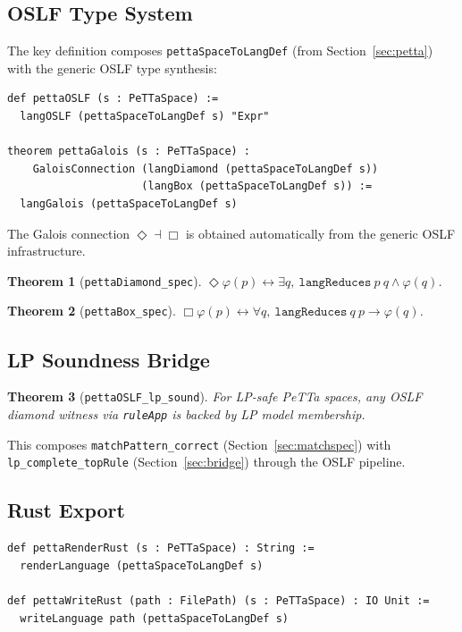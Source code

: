\documentclass[]{article}
\newtheorem{theorem}{Theorem}
\newcommand{\code}[1]{\texttt{#1}}
\newcommand{\PeTTa}{\textup{PeTTa}}
\newcommand{\OSLF}{\textup{OSLF}}
\begin{document}
\subsection{OSLF Type System}

The key definition composes \code{pettaSpaceToLangDef} (from
Section~\ref{sec:petta}) with the generic \OSLF{} type synthesis:

\begin{lstlisting}[language=lean]
def pettaOSLF (s : PeTTaSpace) :=
  langOSLF (pettaSpaceToLangDef s) "Expr"

theorem pettaGalois (s : PeTTaSpace) :
    GaloisConnection (langDiamond (pettaSpaceToLangDef s))
                     (langBox (pettaSpaceToLangDef s)) :=
  langGalois (pettaSpaceToLangDef s)
\end{lstlisting}

The Galois connection $\Diamond \dashv \Box$ is obtained automatically from
the generic \OSLF{} infrastructure.

\begin{theorem}[\code{pettaDiamond\_spec}]
$\Diamond\varphi(p) \leftrightarrow \exists q,\ \code{langReduces}\ p\ q \wedge \varphi(q)$.
\end{theorem}

\begin{theorem}[\code{pettaBox\_spec}]
$\Box\varphi(p) \leftrightarrow \forall q,\ \code{langReduces}\ q\ p \to \varphi(q)$.
\end{theorem}

\subsection{LP Soundness Bridge}

\begin{theorem}[\code{pettaOSLF\_lp\_sound}]
For LP-safe \PeTTa{} spaces, any \OSLF{} diamond witness via \code{ruleApp}
is backed by LP model membership.
\end{theorem}

This composes \code{matchPattern\_correct} (Section~\ref{sec:matchspec}) with
\code{lp\_complete\_topRule} (Section~\ref{sec:bridge}) through the \OSLF{} pipeline.

\subsection{Rust Export}

\begin{lstlisting}[language=lean]
def pettaRenderRust (s : PeTTaSpace) : String :=
  renderLanguage (pettaSpaceToLangDef s)

def pettaWriteRust (path : FilePath) (s : PeTTaSpace) : IO Unit :=
  writeLanguage path (pettaSpaceToLangDef s)
\end{lstlisting}
\end{document}
